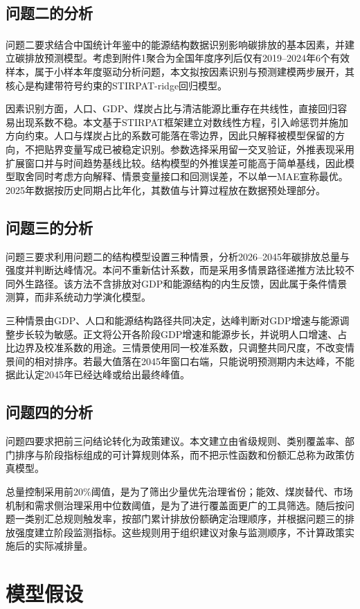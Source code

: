 \documentclass[12pt,a4paper]{ctexart}
\theoremstyle{definition}
\theoremstyle{plain}
\theoremstyle{remark}
\newcommand{\upcite}[1]{\textsuperscript{\cite{#1}}}
\begin{document}
\subsection{问题二的分析}
问题二要求结合中国统计年鉴中的能源结构数据\upcite{stats}识别影响碳排放的基本因素，并建立碳排放预测模型。考虑到附件1聚合为全国年度序列后仅有2019--2024年6个有效样本，属于小样本年度驱动分析问题，本文拟按因素识别与预测建模两步展开，其核心是构建带符号约束的STIRPAT-ridge回归模型。

因素识别方面，人口、GDP、煤炭占比与清洁能源比重存在共线性，直接回归容易出现系数不稳。本文基于STIRPAT框架建立对数线性方程，引入岭惩罚并施加方向约束。人口与煤炭占比的系数可能落在零边界，因此只解释被模型保留的方向，不把贴界变量写成已被稳定识别。参数选择采用留一交叉验证，外推表现采用扩展窗口并与时间趋势基线比较。结构模型的外推误差可能高于简单基线，因此模型取舍同时考虑方向解释、情景变量接口和回测误差，不以单一MAE宣称最优。2025年数据按历史同期占比年化，其数值与计算过程放在数据预处理部分。

\subsection{问题三的分析}
问题三要求利用问题二的结构模型设置三种情景，分析2026--2045年碳排放总量与强度并判断达峰情况。本问不重新估计系数，而是采用多情景路径递推方法比较不同外生路径。该方法不含排放对GDP和能源结构的内生反馈，因此属于条件情景测算，而非系统动力学演化模型。

三种情景由GDP、人口和能源结构路径共同决定，达峰判断对GDP增速与能源调整步长较为敏感。正文将公开各阶段GDP增速和能源步长，并说明人口增速、占比边界及校准系数的用途。三情景使用同一校准系数，只调整共同尺度，不改变情景间的相对排序。若最大值落在2045年窗口右端，只能说明预测期内未达峰，不能据此认定2045年已经达峰或给出最终峰值。

\subsection{问题四的分析}
问题四要求把前三问结论转化为政策建议。本文建立由省级规则、类别覆盖率、部门排序与阶段指标组成的可计算规则体系，而不把示性函数和份额汇总称为政策仿真模型。

总量控制采用前20\%阈值，是为了筛出少量优先治理省份；能效、煤炭替代、市场机制和需求侧治理采用中位数阈值，是为了进行覆盖面更广的工具筛选。随后按问题一类别汇总规则触发率，按部门累计排放份额确定治理顺序，并根据问题三的排放强度建立阶段监测指标。这些规则用于组织建议对象与监测顺序，不计算政策实施后的实际减排量。


\section{模型假设}
\end{document}
